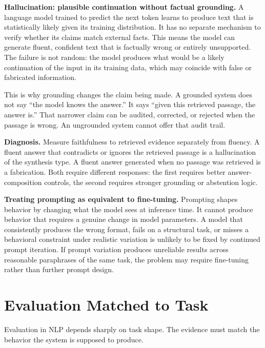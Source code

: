\begin{failurebox}
\textbf{Hallucination: plausible continuation without factual grounding.}
A language model trained to predict the next token learns to produce text that is statistically likely given its training distribution. It has no separate mechanism to verify whether its claims match external facts. This means the model can generate fluent, confident text that is factually wrong or entirely unsupported. The failure is not random: the model produces what would be a likely continuation of the input in its training data, which may coincide with false or fabricated information.

\smallskip
This is why grounding changes the claim being made. A grounded system does not say ``the model knows the answer.'' It says ``given this retrieved passage, the answer is.'' That narrower claim can be audited, corrected, or rejected when the passage is wrong. An ungrounded system cannot offer that audit trail.

\smallskip
\textbf{Diagnosis.} Measure faithfulness to retrieved evidence separately from fluency. A fluent answer that contradicts or ignores the retrieved passage is a hallucination of the synthesis type. A fluent answer generated when no passage was retrieved is a fabrication. Both require different responses: the first requires better answer-composition controls, the second requires stronger grounding or abstention logic.
\end{failurebox}

\begin{failurepattern}
\textbf{Treating prompting as equivalent to fine-tuning.} Prompting shapes behavior by changing what the model sees at inference time. It cannot produce behavior that requires a genuine change in model parameters. A model that consistently produces the wrong format, fails on a structural task, or misses a behavioral constraint under realistic variation is unlikely to be fixed by continued prompt iteration. If prompt variation produces unreliable results across reasonable paraphrases of the same task, the problem may require fine-tuning rather than further prompt design.
\end{failurepattern}

\section{Evaluation Matched to Task}

Evaluation in NLP depends sharply on task shape. The evidence must match the behavior the system is supposed to produce.

